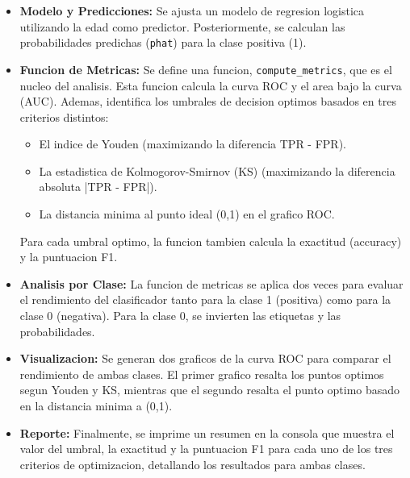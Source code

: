 \begin{itemize}
    \item \textbf{Modelo y Predicciones:} Se ajusta un modelo de regresion logistica utilizando la edad como predictor. Posteriormente, se calculan las probabilidades predichas (\texttt{phat}) para la clase positiva (1).

    \item \textbf{Funcion de Metricas:} Se define una funcion, \texttt{compute\_metrics}, que es el nucleo del analisis. Esta funcion calcula la curva ROC y el area bajo la curva (AUC). Ademas, identifica los umbrales de decision optimos basados en tres criterios distintos:
    \begin{itemize}
        \item El indice de Youden (maximizando la diferencia TPR - FPR).
        \item La estadistica de Kolmogorov-Smirnov (KS) (maximizando la diferencia absoluta |TPR - FPR|).
        \item La distancia minima al punto ideal (0,1) en el grafico ROC.
    \end{itemize}
    Para cada umbral optimo, la funcion tambien calcula la exactitud (accuracy) y la puntuacion F1.

    \item \textbf{Analisis por Clase:} La funcion de metricas se aplica dos veces para evaluar el rendimiento del clasificador tanto para la clase 1 (positiva) como para la clase 0 (negativa). Para la clase 0, se invierten las etiquetas y las probabilidades.

    \item \textbf{Visualizacion:} Se generan dos graficos de la curva ROC para comparar el rendimiento de ambas clases. El primer grafico resalta los puntos optimos segun Youden y KS, mientras que el segundo resalta el punto optimo basado en la distancia minima a (0,1).

    \item \textbf{Reporte:} Finalmente, se imprime un resumen en la consola que muestra el valor del umbral, la exactitud y la puntuacion F1 para cada uno de los tres criterios de optimizacion, detallando los resultados para ambas clases.
\end{itemize}




\clearpage




